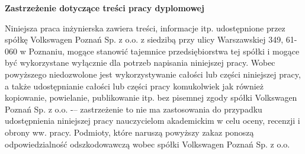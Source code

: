 \begin{center}
    \Large \textbf{Zastrzeżenie dotyczące treści pracy dyplomowej}
\end{center}

\vspace{1cm}


Niniejsza praca inżynierska zawiera treści, informacje itp. udostępnione przez spółkę Volkswagen Poznań Sp.
z o.o.
z siedzibą przy ulicy Warszawskiej 349, 61-060 w Poznaniu, mogące stanowić
tajemnice przedsiębiorstwa tej spółki i mogące być wykorzystane wyłącznie dla
potrzeb napisania niniejszej pracy. Wobec powyższego niedozwolone jest
wykorzystywanie całości lub części niniejszej pracy, a także udostępnianie całości
lub części pracy komukolwiek jak również kopiowanie, powielanie, publikowanie itp.
bez pisemnej zgody spółki Volkswagen Poznań Sp. z o.o. -– zastrzeżenie to nie ma
zastosowania do przypadku udostępnienia niniejszej pracy nauczycielom
akademickim w celu oceny, recenzji
i obrony ww. pracy. Podmioty, które naruszą powyższy zakaz ponoszą
odpowiedzialność odszkodowawczą wobec spółki Volkswagen Poznań Sp. z o.o.